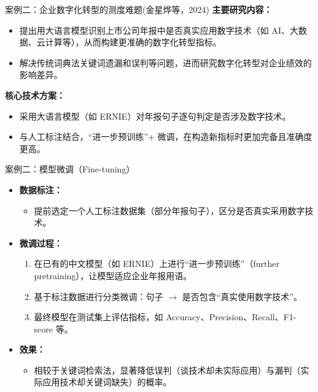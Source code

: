 \documentclass{beamer}
\begin{document}
    
    \begin{frame}{案例二：企业数字化转型的测度难题(金星烨等，2024)}
    \textbf{主要研究内容：}
    \begin{itemize}
      \item 提出用大语言模型识别上市公司年报中是否真实应用数字技术（如 AI、大数据、云计算等），从而构建更准确的数字化转型指标。
      \item 解决传统词典法关键词遗漏和误判等问题，进而研究数字化转型对企业绩效的影响差异。
    \end{itemize}
    
    \textbf{核心技术方案：}
    \begin{itemize}
      \item 采用大语言模型（如 ERNIE）对年报句子逐句判定是否涉及数字技术。
      \item 与人工标注结合，“进一步预训练”+ 微调，在构造新指标时更加完备且准确度更高。
    \end{itemize}
    \end{frame}
    
    \begin{frame}{案例二：模型微调（Fine-tuning）}
    \begin{itemize}
      \item \textbf{数据标注：}
      \begin{itemize}
        \item 提前选定一个人工标注数据集（部分年报句子），区分是否真实采用数字技术。
      \end{itemize}
      \item \textbf{微调过程：}
      \begin{enumerate}
        \item 在已有的中文模型（如 ERNIE）上进行“进一步预训练”（further pretraining），让模型适应企业年报用语。
        \item 基于标注数据进行分类微调：句子 $\rightarrow$ 是否包含“真实使用数字技术”。
        \item 最终模型在测试集上评估指标，如 Accuracy、Precision、Recall、F1-score 等。
      \end{enumerate}
      \item \textbf{效果：}
      \begin{itemize}
        \item 相较于关键词检索法，显著降低误判（谈技术却未实际应用）与漏判（实际应用技术却关键词缺失）的概率。
      \end{itemize}
    \end{itemize}
    \end{frame}
\end{document}
